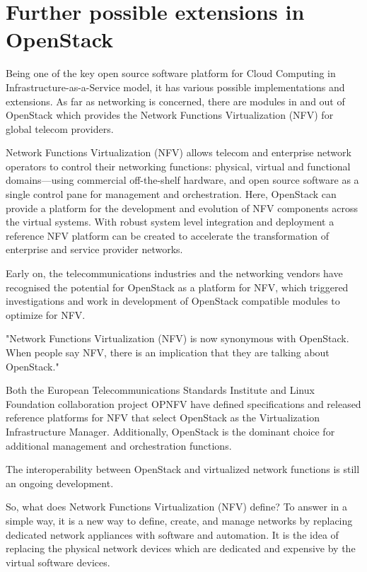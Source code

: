 
\chapter{Further possible extensions in OpenStack}\label{ch:futurepossibilities}
Being one of the key open source software platform for Cloud Computing in Infrastructure-as-a-Service model, it has various possible implementations and extensions.
As far as networking is concerned, there are modules in and out of OpenStack which provides the Network Functions Virtualization (NFV) for global telecom providers.

Network Functions Virtualization (NFV) allows telecom and enterprise network operators to control their networking functions: physical, virtual and functional domains—using commercial off-the-shelf hardware, and open source software as a single control pane for management and orchestration.
Here, OpenStack can provide a platform for the development and evolution of NFV components across the virtual systems. With robust system level integration and deployment a reference NFV platform can be created to accelerate the transformation of enterprise and service provider networks.

Early on, the telecommunications industries and the networking vendors have recognised the potential for OpenStack as a platform for NFV, which triggered investigations and work in development of OpenStack compatible modules to optimize for NFV.

"Network Functions Virtualization (NFV) is now synonymous with OpenStack. When people say NFV, there is an implication that they are talking about OpenStack."\cite{openstack_nfv}

Both the European Telecommunications Standards Institute and Linux Foundation collaboration project OPNFV have defined specifications and released reference platforms for NFV that select OpenStack as the Virtualization Infrastructure Manager. Additionally, OpenStack is the dominant choice for additional management and orchestration functions.\cite{nfv_technical_overview}

The interoperability between OpenStack and virtualized network functions is still an ongoing development.

So, what does Network Functions Virtualization (NFV) define?
To answer in a simple way, it is a new way to define, create, and manage networks by replacing dedicated network appliances with software and automation.
It is the idea of replacing the physical network devices which are dedicated and expensive by the virtual software devices.


